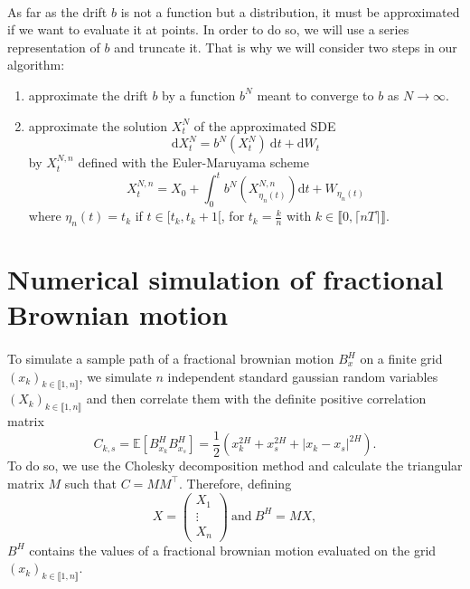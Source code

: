 \documentclass[11pt]{article}
\newcommand{\E}{\mathbb{E}}
\newcommand{\di}{\mathrm{d}}
\begin{document}
    \paragraph{}
    As far as the drift $b$ is not a function but a distribution, it must be approximated if we want to evaluate it at points. In order to do so, we will use a series representation of $b$ and truncate it. That is why we will consider two steps in our algorithm: \begin{enumerate}
        \item approximate the drift $b$ by a function $b^N$ meant to converge to $b$ as $N\rightarrow\infty$.
        \item approximate the solution $X^N_t$ of the approximated SDE
        \begin{equation} \label{sde2}
        \di X^N_t = b^N\left(X^N_t\right)\ \di t + \di W_t
        \end{equation} 
        by $X^{N,n}_t$ defined with the Euler-Maruyama scheme
        \begin{equation*}
        X^{N,n}_t = X_0 + \int_0^t b^N\left(X^{N,n}_{\eta_n(t)}\right)\di t + W_{\eta_n(t)}
        \end{equation*}
        where $\eta_n(t)=t_k$ if $t\in[t_k,t_k+1[$, for $t_k=\frac{k}{n}$ with $ k\in\llbracket0,\lceil nT\rceil\rrbracket$.
        
    \end{enumerate}

\section{Numerical simulation of fractional Brownian motion}    
    \paragraph{}
    To simulate a sample path of a fractional brownian motion $B^H_x$ on a finite grid $(x_k)_{k\in\llbracket1,n\rrbracket}$, we simulate $n$ independent standard gaussian random variables $(X_k)_{k\in\llbracket1,n\rrbracket}$ and then correlate them with the definite positive correlation matrix 
    $$C_{k,s}=\E\left[B_{x_k}^HB_{x_s}^H\right]=\frac{1}{2}\left(x_k^{2H}+x_s^{2H}+|x_k-x_s|^{2H}\right).$$
    To do so, we use the Cholesky decomposition method and calculate the triangular matrix $M$ such that $C=MM^\top$. Therefore, defining
    $$X = \begin{pmatrix}
    X_1 \\ \vdots \\ X_n
    \end{pmatrix}\ \mathrm{and}\ B^H = MX,$$
    $B^H$ contains the values of a fractional brownian motion evaluated on the grid $(x_k)_{k\in\llbracket1,n\rrbracket}$.
    
\end{document}
